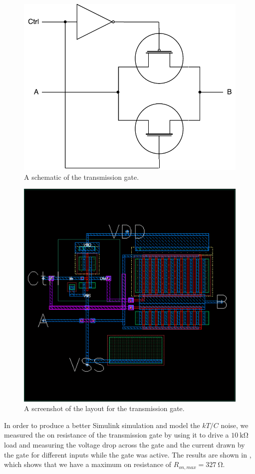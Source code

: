 \documentclass[journal,hidelinks]{IEEEtran}
\begin{document}
\begin{figure}[!htb]
  \centering
  \includegraphics[height=0.5\columnwidth]{diagrams/transmission_gate.pdf}
  \caption{A schematic of the transmission gate.}
  \label{fig:transmission_gate}
\end{figure}

\begin{figure}[!htb]
  \centering
  \includegraphics[width=0.8\columnwidth]{layout/transmission_gate.png}
  \caption{A screenshot of the layout for the transmission gate.}
  \label{fig:transmission_gate_layout}
\end{figure}

In order to produce a better Simulink simulation and model the $kT/C$ noise, we measured the on resistance of the transmission gate by using it to drive a $\SI{10}{\kilo\ohm}$ load and measuring the voltage drop across the gate and the current drawn by the gate for different inputs while the gate was active. The results are shown in , which shows that we have a maximum on resistance of $R_{on, max} = \SI{327}{\ohm}$.
\end{document}
